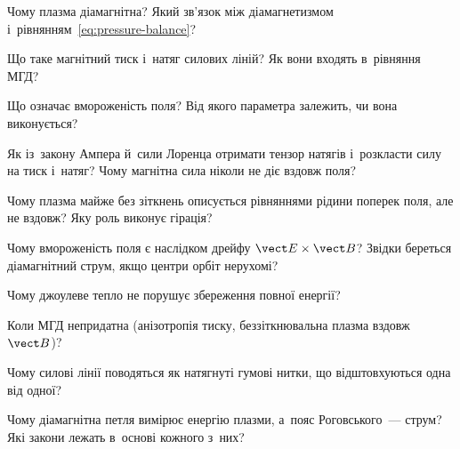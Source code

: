 \begin{Questions}
\begin{quizlist}
\item Чому плазма діамагнітна? Який зв'язок між діамагнетизмом
		  і~рівнянням~\eqref{eq:pressure-balance}?

\item Що таке магнітний тиск і~натяг силових ліній? Як вони входять в~рівняння
		  МГД?

\item Що означає вмороженість поля? Від якого параметра залежить, чи вона
		  виконується?

\item Як із~закону Ампера й~сили Лоренца отримати тензор натягів і~розкласти силу
		  на тиск і~натяг? Чому магнітна сила ніколи не діє вздовж поля?

\item Чому плазма майже без зіткнень описується рівняннями рідини поперек поля,
		  але не вздовж? Яку роль виконує гірація?

\item Чому вмороженість поля є наслідком дрейфу $\vect E\times\vect B$? Звідки
		  береться діамагнітний струм, якщо центри орбіт нерухомі?

\item Чому джоулеве тепло не порушує збереження повної енергії?

\item Коли МГД непридатна (анізотропія тиску, беззіткнювальна плазма вздовж $\vect B$)?

\item Чому силові лінії поводяться як натягнуті гумові нитки, що відштовхуються одна від одної?

\item Чому діамагнітна петля вимірює енергію плазми, а~пояс Роговського~--- струм? Які закони лежать в~основі кожного з~них?

\end{quizlist}
\end{Questions}

